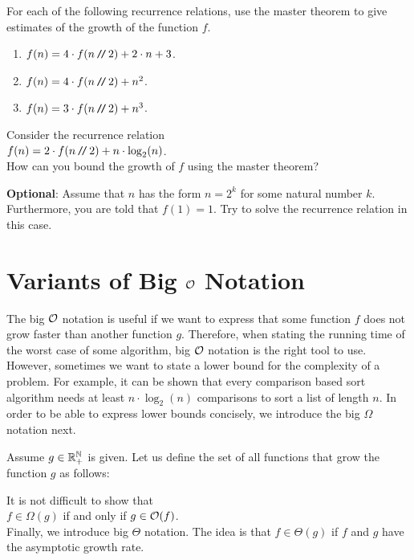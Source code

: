 \exercise
For each of the following recurrence relations, use the master theorem to give estimates of the
growth of the function $f$. 
\begin{enumerate}
\item $f(n) = 4 \cdot f(n \mbox{\,\texttt{/}$\!$\texttt{/}\,} 2) + 2 \cdot n + 3$.
\item $f(n) = 4 \cdot f(n \mbox{\,\texttt{/}$\!$\texttt{/}\,} 2) + n^2$.
\item $f(n) = 3 \cdot f(n \mbox{\,\texttt{/}$\!$\texttt{/}\,} 2) + n^3$.  \eox
\end{enumerate}

\exercise
Consider the recurrence relation
\\[0.2cm]
\hspace*{1.3cm}
$f(n) = 2 \cdot f(n \mbox{\,\texttt{/}$\!$\texttt{/}\,} 2) + n \cdot \log_2(n)$.
\\[0.2cm] 
How can you bound the growth of $f$ using the master theorem? 
\vspace*{0.1cm}

\noindent
\textbf{Optional}: Assume that $n$ has the form $n = 2^k$ for some natural number $k$.
Furthermore, you are told that $f(1) = 1$.  Try to solve the recurrence relation in this case.
\eox

\section{Variants of Big $\mathcal{O}$ Notation}
The big $\mathcal{O}$ notation is useful if we want to express that some function $f$ does not grow faster
than another function $g$.  Therefore, when stating the running time of the worst case of some algorithm,
big $\mathcal{O}$ notation is the right tool to use.  However, sometimes we want to state a lower bound for
the complexity of a problem.  For example, it can be shown that every comparison based sort algorithm needs at least
$n \cdot \log_2(n)$ comparisons to sort a list of length $n$.  In order to be able to express lower
bounds concisely, we introduce the big $\Omega$ notation next.

\begin{Definition}[$\Omega(g)$] 
  Assume $g \in {\mathbb R}_+^{{\mathbb N}}$ is given.   Let us define the set of all functions that grow 
   the function $g$ as follows:
  \\[0.2cm]
  \hspace*{0.5cm} 
  \colorbox{red}{}
  \eox
\end{Definition}
It is not difficult to show that
\\[0.2cm]
\hspace*{1.3cm}
 $f \in \Omega(g)$ \quad if and only if \quad $g \in \mathcal{O}(f)$.
\\[0.2cm]
Finally, we introduce big $\Theta$ notation.  The idea is that $f \in \Theta(g)$ if 
$f$ and $g$ have the  asymptotic growth rate. 

